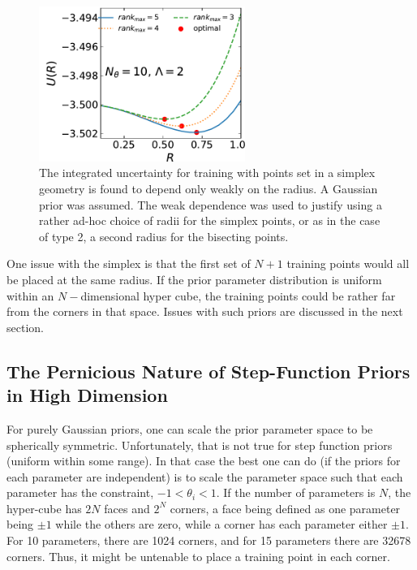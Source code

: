 \documentclass[UserManual.tex]{subfiles}
\begin{document}
\begin{figure}
\centerline{\includegraphics[width=0.6\textwidth]{figs/SimplexUncertainty}}
\caption{\label{fig:SimplexUncertainty}
The integrated uncertainty for training with points set in a simplex geometry is found to depend only weakly on the radius. A Gaussian prior was assumed. The weak dependence was used to justify using a rather ad-hoc choice of radii for the simplex points, or as in the case of type 2, a second radius for the bisecting points.}
\end{figure}

One issue with the simplex is that the first set of $N+1$ training points would all be placed at the same radius. If the prior parameter distribution is uniform within an $N-$dimensional hyper cube, the training  points could be rather far from the corners in that space. Issues with such priors are discussed in the next section.

\subsection{The Pernicious Nature of Step-Function Priors in High Dimension}

For purely Gaussian priors, one can scale the prior parameter space to be spherically symmetric. Unfortunately, that is not true for step function priors (uniform within some range). In that case the best one can do (if the priors for each parameter are independent) is to scale the parameter space such that each parameter has the constraint, $-1<\theta_i<1$. If the number of parameters is $N$, the hyper-cube has $2N$ faces and $2^N$ corners, a face being defined as one parameter being $\pm 1$ while the others are zero, while a corner has each parameter either $\pm 1$. For 10 parameters, there are 1024 corners, and for 15 parameters there are 32678 corners. Thus, it might be untenable to place a training point in each corner. 
\end{document}
